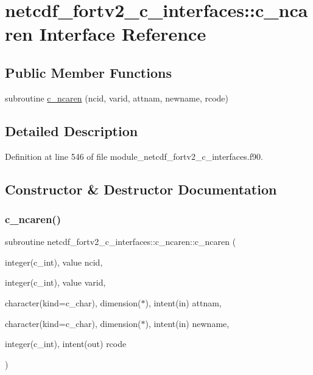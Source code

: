 \hypertarget{interfacenetcdf__fortv2__c__interfaces_1_1c__ncaren}{}\section{netcdf\+\_\+fortv2\+\_\+c\+\_\+interfaces\+:\+:c\+\_\+ncaren Interface Reference}
\label{interfacenetcdf__fortv2__c__interfaces_1_1c__ncaren}
\subsection*{Public Member Functions}
\begin{DoxyCompactItemize}
\item 
subroutine \hyperlink{interfacenetcdf__fortv2__c__interfaces_1_1c__ncaren_af16f1e7608e07205164819d10ee0ed38}{c\+\_\+ncaren} (ncid, varid, attnam, newname, rcode)
\end{DoxyCompactItemize}


\subsection{Detailed Description}


Definition at line 546 of file module\+\_\+netcdf\+\_\+fortv2\+\_\+c\+\_\+interfaces.\+f90.



\subsection{Constructor \& Destructor Documentation}
\mbox{\label{interfacenetcdf__fortv2__c__interfaces_1_1c__ncaren_af16f1e7608e07205164819d10ee0ed38}} 
\subsubsection{\texorpdfstring{c\+\_\+ncaren()}{c\_ncaren()}}
{\footnotesize\ttfamily subroutine netcdf\+\_\+fortv2\+\_\+c\+\_\+interfaces\+::c\+\_\+ncaren\+::c\+\_\+ncaren (\begin{DoxyParamCaption}\item[{integer(c\+\_\+int), value}]{ncid,  }\item[{integer(c\+\_\+int), value}]{varid,  }\item[{character(kind=c\+\_\+char), dimension($\ast$), intent(in)}]{attnam,  }\item[{character(kind=c\+\_\+char), dimension($\ast$), intent(in)}]{newname,  }\item[{integer(c\+\_\+int), intent(out)}]{rcode }\end{DoxyParamCaption})}



